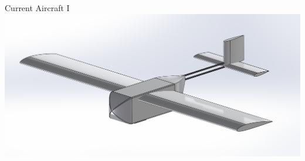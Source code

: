 \documentclass{beamer}
\begin{document}
    \begin{frame}{Current Aircraft I}
        \centering
        \includegraphics[width=\textwidth]{figures/current/Current Iso.png}
    \end{frame}
\end{document}

